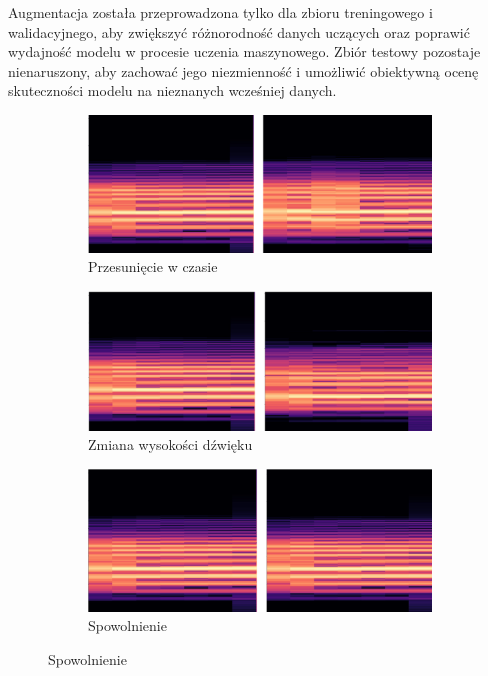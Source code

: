 Augmentacja została przeprowadzona tylko dla zbioru treningowego i walidacyjnego, aby zwiększyć różnorodność danych uczących oraz poprawić wydajność modelu w procesie uczenia maszynowego.
Zbiór testowy pozostaje nienaruszony, aby zachować jego niezmienność i umożliwić obiektywną ocenę skuteczności modelu na nieznanych wcześniej danych.

\begin{figure}[hp]
    \centering
    \begin{subfigure}{0.68\textwidth}
        \includegraphics[width=\linewidth]{./img/augmentation/rolled}
        \caption{Przesunięcie w czasie\@}
        \label{fig:roll}
    \end{subfigure}

    \begin{subfigure}{0.68\textwidth}
        \includegraphics[width=\linewidth]{./img/augmentation/pitch}
        \caption{Zmiana wysokości dźwięku\@}
        \label{fig:pitch}
    \end{subfigure}

    \begin{subfigure}{0.68\textwidth}
        \includegraphics[width=\linewidth]{./img/augmentation/slow}
        \caption{Spowolnienie\@}
        \label{fig:slow}
    \end{subfigure}


\end{figure}
